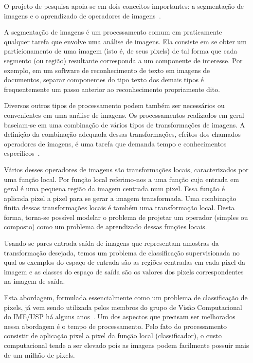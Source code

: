 \documentclass{article}
\begin{document}
	O projeto de pesquisa apoia-se em dois conceitos importantes: a
	segmentação de imagens e o aprendizado de
	operadores de imagens~\cite{GonzWood:02,2016:tutorialSIB}.
	
	A segmentação de imagens é um processamento comum em praticamente
	qualquer tarefa que envolve uma análise de imagens. Ela consiste em
	se obter um particionamento de uma imagem (isto é, de seus pixels) de
	tal forma que cada segmento (ou região) resultante corresponda a um
	componente de interesse. Por exemplo, em um software de reconhecimento
	de texto em imagens de documentos, separar componentes do tipo texto
	dos demais tipos é frequentemente um passo anterior ao reconhecimento
	propriamente dito.
	
	Diversos outros tipos de processamento podem também ser necessários ou
	convenientes em uma análise de imagens. Os processamentos realizados
	em geral baseiam-se em uma combinação de vários tipos de
	transformações de imagens. A definição da combinação adequada dessas
	transformações, efeitos dos chamados operadores de imagens, é uma
	tarefa que demanda tempo e conhecimentos específicos~\cite{2016:tutorialSIB}.
	
	Vários desses operadores de imagens são transformações locais,
	caracterizados por uma função local. Por função local referimo-nos a
	uma função cuja entrada em geral é uma pequena região da imagem
	centrada num pixel. Essa função é aplicada pixel a pixel para se gerar
	a imagem transformada. Uma combinação finita dessas transformações
	locais é também uma transformação local. Desta forma, torna-se
	possível modelar o problema de projetar um operador (simples ou
	composto) como um problema de aprendizado dessas funções locais.
	
	Usando-se pares entrada-saída de imagens que representam amostras da
	transformação desejada, temos um problema de classificação
	supervisionada no qual os exemplos do espaço de entrada são as regiões
	centradas em cada pixel da imagem e as classes do espaço de saída são
	os valores dos pixels correspondentes na imagem de saída.
	
	Esta abordagem, formulada essencialmente como um problema de
	classificação de pixels, já vem sendo utilizada pelos membros do grupo
	de Visão Computacional do IME/USP há alguns anos~\cite{2016:tutorialSIB}.
	Um dos aspectos que precisam ser melhorados nessa abordagem é o tempo
	de processamento. Pelo fato do processamento consistir de aplicação
	pixel a pixel da função local (classificador), o custo computacional
	tende a ser elevado pois as imagens podem facilmente possuir mais de
	um milhão de pixels.
	
\end{document}
